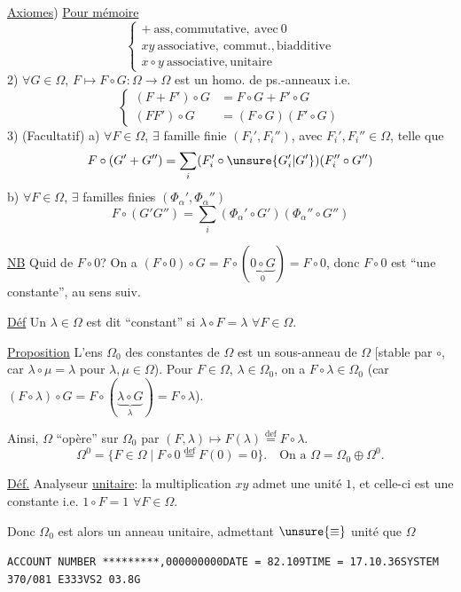 \uline{Axiomes}) \uline{Pour mémoire}
\[
\left\{
\begin{array}{l}
+\ \mathrm{ass,commutative,\ avec}\ 0\\
xy\ \mathrm{associative,\ commut.,biadditive}\\
x\circ y\ \mathrm{associative,unitaire}
\end{array}
\right.
\]
2) $\forall G\in\Omega$, $F\longmapsto F\circ G:\Omega\longrightarrow\Omega$ est un homo. de ps.-anneaux i.e.
\[
\left\{
\begin{aligned}
(F+F')\circ G&=F\circ G+F'\circ G\\
(FF')\circ G&=(F\circ G)(F'\circ G)
\end{aligned}
\right.
\]
3) (Facultatif) a) $\forall F\in\Omega$, $\exists$ famille finie $(F_i',F_i'')$, avec $F_i',F_i''\in\Omega$, telle que
\[
F\circ(G'+G'')=\sum_i(F_i'\circ\unsure{G_i'|G'})(F_i''\circ G'')
\]
b) $\forall F\in\Omega$, $\exists$ familles finies $(\Phi_\alpha',\Phi_\alpha'')$
\[
F\circ(G'G'')=\sum_i(\Phi_\alpha'\circ G')(\Phi_\alpha''\circ G'')
\]

\uline{NB} Quid de $F\circ0$? On a $(F\circ0)\circ G=F\circ(\underbrace{0\circ G}_{0})=F\circ0$,
donc $F\circ0$ est ``une constante'', au sens suiv.

\uline{Déf} Un $\lambda\in\Omega$ est dit ``constant'' si $\lambda\circ F=\lambda$ $\forall F\in\Omega$.

\uline{Proposition} L'ens $\Omega_0$ des constantes de $\Omega$ est un sous-anneau de $\Omega$
[stable par $\circ$, car $\lambda\circ\mu=\lambda$ pour $\lambda,\mu\in\Omega$).
Pour $F\in\Omega$, $\lambda\in\Omega_0$, on a $F\circ\lambda\in\Omega_0$
(car $(F\circ\lambda)\circ G=F\circ(\underbrace{\lambda\circ G}_{\lambda})=F\circ\lambda$).

Ainsi, $\Omega$ ``opère'' sur $\Omega_0$ par $(F,\lambda)\longmapsto F(\lambda)\overset{\mathrm{def}}{=}F\circ\lambda$.
\[
\Omega^0=\{F\in\Omega\mid F\circ0\overset{\mathrm{def}}{=}F(0)=0\}.
\quad\text{On a }\Omega=\Omega_0\oplus\Omega^0.
\]

\uline{Déf.} Analyseur \uline{unitaire}: la multiplication $xy$ admet une unité $1$, et celle-ci est une constante i.e.
$1\circ F=1$ $\forall F\in\Omega$.

Donc $\Omega_0$ est alors un anneau unitaire, admettant
$\unsure{\equiv}$ unité que $\Omega$

\texttt{ACCOUNT NUMBER *********,000000000\quad DATE = 82.109\quad TIME = 17.10.36\quad SYSTEM 370/081 E333\quad VS2 03.8G}

